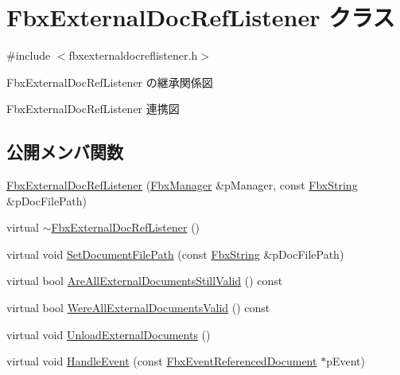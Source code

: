\hypertarget{class_fbx_external_doc_ref_listener}{}\section{Fbx\+External\+Doc\+Ref\+Listener クラス}
\label{class_fbx_external_doc_ref_listener}


{\ttfamily \#include $<$fbxexternaldocreflistener.\+h$>$}



Fbx\+External\+Doc\+Ref\+Listener の継承関係図


Fbx\+External\+Doc\+Ref\+Listener 連携図
\subsection*{公開メンバ関数}
\begin{DoxyCompactItemize}
\item 
\hyperlink{class_fbx_external_doc_ref_listener_a9118825e2ee04df01ee6117ab55fd175}{Fbx\+External\+Doc\+Ref\+Listener} (\hyperlink{class_fbx_manager}{Fbx\+Manager} \&p\+Manager, const \hyperlink{class_fbx_string}{Fbx\+String} \&p\+Doc\+File\+Path)
\item 
virtual \hyperlink{class_fbx_external_doc_ref_listener_a4145e93503fe9759dcd8a2ddd515d091}{$\sim$\+Fbx\+External\+Doc\+Ref\+Listener} ()
\item 
virtual void \hyperlink{class_fbx_external_doc_ref_listener_aac019a58c4fda8ce675fb67edb340cbf}{Set\+Document\+File\+Path} (const \hyperlink{class_fbx_string}{Fbx\+String} \&p\+Doc\+File\+Path)
\item 
virtual bool \hyperlink{class_fbx_external_doc_ref_listener_a3bed051aad3654a8e71b31175dc0a51d}{Are\+All\+External\+Documents\+Still\+Valid} () const
\item 
virtual bool \hyperlink{class_fbx_external_doc_ref_listener_a7a7e4947b7f4a250365a8761fb71cd1e}{Were\+All\+External\+Documents\+Valid} () const
\item 
virtual void \hyperlink{class_fbx_external_doc_ref_listener_a0d2e5c292d9aad7263cb16b9008851f2}{Unload\+External\+Documents} ()
\item 
virtual void \hyperlink{class_fbx_external_doc_ref_listener_ab1517a34510c213bad2750763b502a88}{Handle\+Event} (const \hyperlink{class_fbx_event_referenced_document}{Fbx\+Event\+Referenced\+Document} $\ast$p\+Event)
\end{DoxyCompactItemize}
